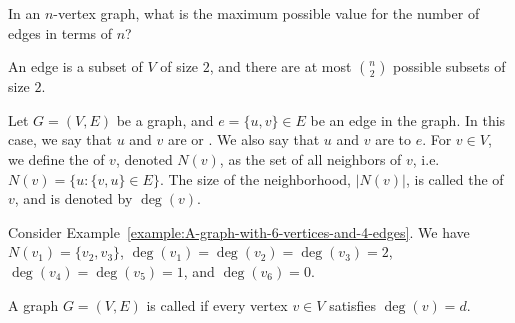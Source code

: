 \begin{flex}
\begin{exercise} \label{exercise:Max-number-of-edges-in-a-graph}
In an $n$-vertex graph, what is the maximum possible value for the number of edges in terms of $n$?
\end{exercise}

\begin{solution}
An edge is a subset of $V$ of size $2$, and there are at most $n \choose 2$ possible subsets of size $2$.
\end{solution}
\end{flex}


\begin{flex}
\begin{definition} \label{definition:Neighborhood-of-a-vertex}
Let $G=(V,E)$ be a graph, and $e = \{u,v\} \in E$ be an edge in the graph. In this case, we say that $u$ and $v$ are  or . We also say that $u$ and $v$ are  to $e$. For $v \in V$, we define the  of $v$, denoted $N(v)$, as the set of all neighbors of $v$, i.e. $N(v) = \{u : \{v,u\} \in E\}$. The size of the neighborhood, $|N(v)|$, is called the  of $v$, and is denoted by $\deg(v)$.
\end{definition}

\begin{example} \label{example:Example-of-neighborhood-and-degree}
Consider Example~\ref{example:A-graph-with-6-vertices-and-4-edges}. We have $N(v_1) = \{v_2,v_3\}$, $\deg(v_1) = \deg(v_2) = \deg(v_3) = 2$, $\deg(v_4) = \deg(v_5) = 1$, and $\deg(v_6) = 0$.
\end{example}
\end{flex}


\begin{definition} \label{definition:d-regular-graphs}
A graph $G = (V,E)$ is called  if every vertex $v \in V$ satisfies $\deg(v) = d$. 
\end{definition}


